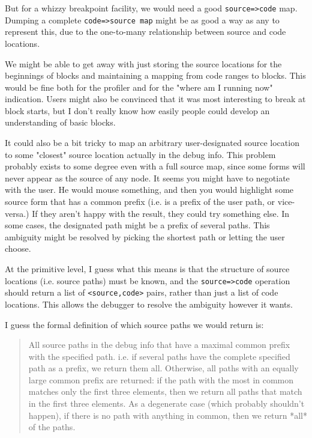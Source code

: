 

But for a whizzy breakpoint facility, we would need a good \verb+source=>code+ map.
Dumping a complete \verb+code=>source map+ might be as good a way as any to represent
this, due to the one-to-many relationship between source and code locations.

We might be able to get away with just storing the source locations for the
beginnings of blocks and maintaining a mapping from code ranges to blocks.
This would be fine both for the profiler and for the "where am I running now"
indication.  Users might also be convinced that it was most interesting to
break at block starts, but I don't really know how easily people could develop
an understanding of basic blocks.

It could also be a bit tricky to map an arbitrary user-designated source
location to some "closest" source location actually in the debug info.
This problem probably exists to some degree even with a full source map, since
some forms will never appear as the source of any node.  It seems you might
have to negotiate with the user.  He would mouse something, and then you would
highlight some source form that has a common prefix (i.e. is a prefix of the
user path, or vice-versa.)  If they aren't happy with the result, they could
try something else.  In some cases, the designated path might be a prefix of
several paths.  This ambiguity might be resolved by picking the shortest path
or letting the user choose.

At the primitive level, I guess what this means is that the structure of source
locations (i.e. source paths) must be known, and the \verb+source=>code+ operation
should return a list of \verb+<source,code>+ pairs, rather than just a list of code
locations.  This allows the debugger to resolve the ambiguity however it wants.

I guess the formal definition of which source paths we would return
is:
\begin{quote}
    All source paths in the debug info that have a maximal common prefix with
    the specified path.  i.e. if several paths have the complete specified path
    as a prefix, we return them all.  Otherwise, all paths with an equally
    large common prefix are returned: if the path with the most in common
    matches only the first three elements, then we return all paths that match
    in the first three elements.  As a degenerate case (which probably
    shouldn't happen), if there is no path with anything in common, then we
    return *all* of the paths.
\end{quote}



